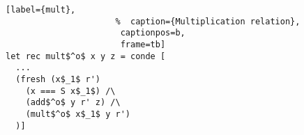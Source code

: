 \begin{figure}[!t]
  \centering
  \begin{minipage}{\columnwidth}
    \begin{lstlisting}[label={mult},
                      %  caption={Multiplication relation},
                       captionpos=b,
                       frame=tb]
let rec mult$^o$ x y z = conde [
  ...
  (fresh (x$_1$ r')
    (x === S x$_1$) /\
    (add$^o$ y r' z) /\
    (mult$^o$ x$_1$ y r')
  )]
    \end{lstlisting}
  \end{minipage}
\end{figure}
